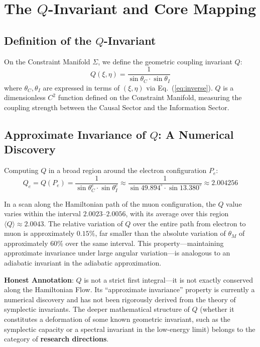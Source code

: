 \documentclass[aps,prd,reprint,nofootinbib]{revtex4-2}
\begin{document}
\section{The $Q$-Invariant and Core Mapping}
\label{sec:qinv}

\subsection{Definition of the $Q$-Invariant}

On the Constraint Manifold $\Sigma$, we define the geometric coupling invariant $Q$:
\begin{equation}
\boxed{Q(\xi, \eta) = \frac{1}{\sin\theta_C \cdot \sin\theta_I}} \label{eq:Q}
\end{equation}
where $\theta_C, \theta_I$ are expressed in terms of $(\xi, \eta)$ via Eq.~(\ref{eq:inverse}). $Q$ is a dimensionless $C^2$ function defined on the Constraint Manifold, measuring the coupling strength between the Causal Sector and the Information Sector.

\subsection{Approximate Invariance of $Q$: A Numerical Discovery}

Computing $Q$ in a broad region around the electron configuration $P_e$:
\begin{equation}
Q_e = Q(P_e) = \frac{1}{\sin\theta_C^e \cdot \sin\theta_I^e} \approx \frac{1}{\sin 49.894^\circ \cdot \sin 13.380^\circ} \approx 2.004256 \label{eq:Qe}
\end{equation}

In a scan along the Hamiltonian path of the muon configuration, the $Q$ value varies within the interval $2.0023$--$2.0056$, with its average over this region $\langle Q \rangle \approx 2.0043$. The relative variation of $Q$ over the entire path from electron to muon is approximately $0.15\%$, far smaller than the absolute variation of $\theta_M$ of approximately $60\%$ over the same interval. This property---maintaining approximate invariance under large angular variation---is analogous to an adiabatic invariant in the adiabatic approximation.

\textbf{Honest Annotation}: $Q$ is not a strict first integral---it is not exactly conserved along the Hamiltonian Flow. Its ``approximate invariance'' property is currently a numerical discovery and has not been rigorously derived from the theory of symplectic invariants. The deeper mathematical structure of $Q$ (whether it constitutes a deformation of some known geometric invariant, such as the symplectic capacity or a spectral invariant in the low-energy limit) belongs to the category of \textbf{research directions}.
\end{document}
